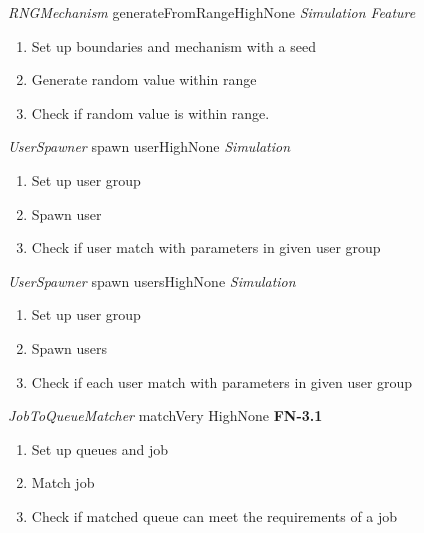 \begin{testcase}{\emph{RNGMechanism} generateFromRange}{High}{None}
	{
		\emph{Simulation Feature}
	}
	{
		\begin{enumerate}
			\item Set up boundaries and mechanism with a seed
			\item Generate random value within range
			\item Check if random value is within range.
		\end{enumerate}
	}
\end{testcase}

\begin{testcase}{\emph{UserSpawner} spawn user}{High}{None}
	{
		\emph{Simulation}
	}
	{
		\begin{enumerate}
			\item Set up user group
			\item Spawn user
			\item Check if user match with parameters in given user group
		\end{enumerate}
	}
\end{testcase}

\begin{testcase}{\emph{UserSpawner} spawn users}{High}{None}
	{
		\emph{Simulation}
	}
	{
		\begin{enumerate}
			\item Set up user group
			\item Spawn users
			\item Check if each user match with parameters in given user group
		\end{enumerate}
	}
\end{testcase}


\begin{testcase}{\emph{JobToQueueMatcher} match}{Very High}{None}
	{
		\textbf{FN-3.1}
	}
	{
		\begin{enumerate}
			\item Set up queues and job
			\item Match job
			\item Check if matched queue can meet the requirements of a job
		\end{enumerate}
	}
\end{testcase}


